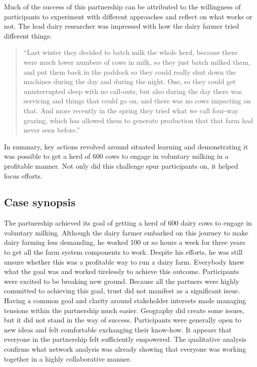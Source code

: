 Much of the success of this partnership can be attributed to the willingness of participants to experiment with different approaches and reflect on what works or not. The lead dairy researcher was impressed with how the dairy farmer tried different things:

\begin{quote}
\small
\enquote{Last winter they decided to batch milk the whole herd, because there were much lower numbers of cows in milk, so they just batch milked them, and put them back in the paddock so they could really shut down the machines during the day and during the night. One, so they could get uninterrupted sleep with no call-outs, but also during the day there was servicing and things that could go on, and there was no cows impacting on that. And more recently in the spring they tried what we call four-way grazing, which has allowed them to generate production that that farm had never seen before.} \\
\end{quote}

In summary, key actions revolved around situated learning and demonstrating it was possible to get a herd of 600 cows to engage in voluntary milking in a profitable manner. Not only did this challenge spur participants on, it helped focus efforts. 

\subsection{Case synopsis}

The partnership achieved its goal of getting a herd of 600 dairy cows to engage in voluntary milking. Although the dairy farmer embarked on this journey to make dairy farming less demanding, he worked 100 or so hours a week for three years to get all the farm system components to work. Despite his efforts, he was still unsure whether this was a profitable way to run a dairy farm. Everybody knew what the goal was and worked tirelessly to achieve this outcome. Participants were excited to be breaking new ground. Because all the partners were highly committed to achieving this goal, trust did not manifest as a significant issue. Having a common goal and clarity around stakeholder interests made managing tensions within the partnership much easier. Geography did create some issues, but it did not stand in the way of success. Participants were generally open to new ideas and felt comfortable exchanging their know-how. It appears that everyone in the partnership felt sufficiently empowered. The qualitative analysis confirms what network analysis was already showing that everyone was working together in a highly collaborative manner. 

